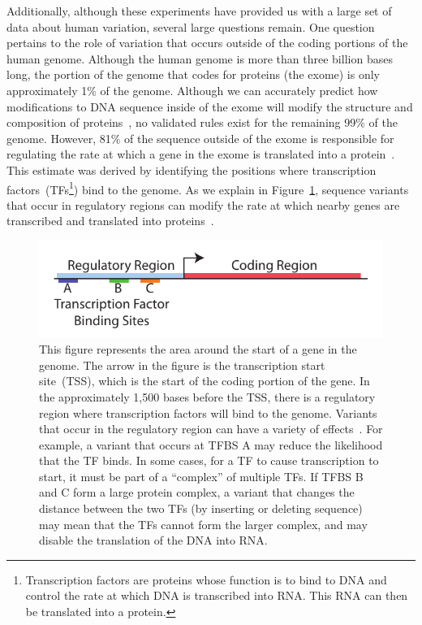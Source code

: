 \documentclass[11pt]{article} %
\begin{document}
Additionally, although these experiments have provided us with a large set of data about
human variation, several large questions remain. One question pertains to the role of
variation that occurs outside of the coding portions of the human genome. Although the human
genome is more than three billion bases long, the portion of the genome that codes for proteins
(the exome) is only approximately 1\% of the genome. Although we can accurately predict how
modifications to DNA sequence inside of the exome will modify the structure and composition of
proteins~\cite{mclaren10}, no validated rules exist for the remaining 99\% of the genome. However,
81\% of the sequence outside of the exome is responsible for regulating the rate at which
a gene in the exome is translated into a protein~\cite{gerstein12}. This estimate was derived
by identifying the positions where transcription factors~(TFs\footnote{Transcription factors are
proteins whose function is to bind to DNA and control the rate at which DNA is transcribed into
RNA. This RNA can then be translated into a protein.}) bind to the genome. As we explain in
Figure~\ref{fig:tfbs}, sequence variants that occur in regulatory regions can modify the rate
at which nearby genes are transcribed and translated into proteins~\cite{levo14, weingarten14}.

\begin{figure}[h]
\begin{center}
\includegraphics[width=0.75\linewidth]{tfbs.pdf}
\caption{This figure represents the area around the start of a gene in the genome. The
arrow in the figure is the transcription start site~(TSS), which is the start of the coding
portion of the gene. In the approximately 1,500 bases before the TSS, there is a regulatory
region where
transcription factors will bind to the genome. Variants that occur in the regulatory region
can have a variety of effects~\cite{levo14, weingarten14}. For example, a variant that occurs
at TFBS A may reduce the likelihood that the TF binds. In some cases, for a TF to cause
transcription to start, it must be part of a ``complex'' of multiple TFs. If TFBS B and C
form a large protein complex, a variant that changes the distance between the two TFs (by
inserting or deleting sequence) may mean that the TFs cannot form the larger complex, and
may disable the translation of the DNA into RNA.}
\label{fig:tfbs}
\end{center}
\end{figure}
\end{document}
